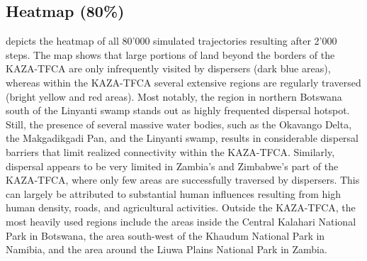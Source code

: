 \documentclass[abstract=on,10pt,a4paper,bibliography=totocnumbered]{article}
\begin{document}
\subsection{Heatmap (80\%)}
 depicts the heatmap of all 80'000 simulated trajectories
resulting after 2'000 steps. The map shows that large portions of land beyond
the borders of the KAZA-TFCA are only infrequently visited by dispersers (dark
blue areas), whereas within the KAZA-TFCA several extensive regions are
regularly traversed (bright yellow and red areas). Most notably, the region in
northern Botswana south of the Linyanti swamp stands out as highly frequented
dispersal hotspot. Still, the presence of several massive water bodies, such as
the Okavango Delta, the Makgadikgadi Pan, and the Linyanti swamp, results in
considerable dispersal barriers that limit realized connectivity within the
KAZA-TFCA. Similarly, dispersal appears to be very limited in Zambia's and
Zimbabwe's part of the KAZA-TFCA, where only few areas are successfully
traversed by dispersers. This can largely be attributed to substantial human
influences resulting from high human density, roads, and agricultural
activities. Outside the KAZA-TFCA, the most heavily used regions include the
areas inside the Central Kalahari National Park in Botswana, the area south-west
of the Khaudum National Park in Namibia, and the area around the Liuwa Plains
National Park in Zambia.
\end{document}
